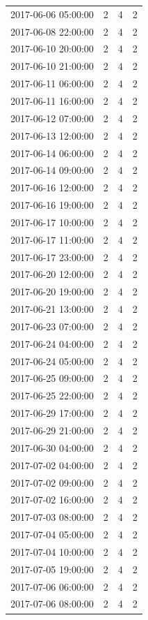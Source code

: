 \begin{tabular}{lrrr}
2017-06-06 05:00:00 & 2 & 4 & 2 \\
2017-06-08 22:00:00 & 2 & 4 & 2 \\
2017-06-10 20:00:00 & 2 & 4 & 2 \\
2017-06-10 21:00:00 & 2 & 4 & 2 \\
2017-06-11 06:00:00 & 2 & 4 & 2 \\
2017-06-11 16:00:00 & 2 & 4 & 2 \\
2017-06-12 07:00:00 & 2 & 4 & 2 \\
2017-06-13 12:00:00 & 2 & 4 & 2 \\
2017-06-14 06:00:00 & 2 & 4 & 2 \\
2017-06-14 09:00:00 & 2 & 4 & 2 \\
2017-06-16 12:00:00 & 2 & 4 & 2 \\
2017-06-16 19:00:00 & 2 & 4 & 2 \\
2017-06-17 10:00:00 & 2 & 4 & 2 \\
2017-06-17 11:00:00 & 2 & 4 & 2 \\
2017-06-17 23:00:00 & 2 & 4 & 2 \\
2017-06-20 12:00:00 & 2 & 4 & 2 \\
2017-06-20 19:00:00 & 2 & 4 & 2 \\
2017-06-21 13:00:00 & 2 & 4 & 2 \\
2017-06-23 07:00:00 & 2 & 4 & 2 \\
2017-06-24 04:00:00 & 2 & 4 & 2 \\
2017-06-24 05:00:00 & 2 & 4 & 2 \\
2017-06-25 09:00:00 & 2 & 4 & 2 \\
2017-06-25 22:00:00 & 2 & 4 & 2 \\
2017-06-29 17:00:00 & 2 & 4 & 2 \\
2017-06-29 21:00:00 & 2 & 4 & 2 \\
2017-06-30 04:00:00 & 2 & 4 & 2 \\
2017-07-02 04:00:00 & 2 & 4 & 2 \\
2017-07-02 09:00:00 & 2 & 4 & 2 \\
2017-07-02 16:00:00 & 2 & 4 & 2 \\
2017-07-03 08:00:00 & 2 & 4 & 2 \\
2017-07-04 05:00:00 & 2 & 4 & 2 \\
2017-07-04 10:00:00 & 2 & 4 & 2 \\
2017-07-05 19:00:00 & 2 & 4 & 2 \\
2017-07-06 06:00:00 & 2 & 4 & 2 \\
2017-07-06 08:00:00 & 2 & 4 & 2 \\

\end{tabular}
